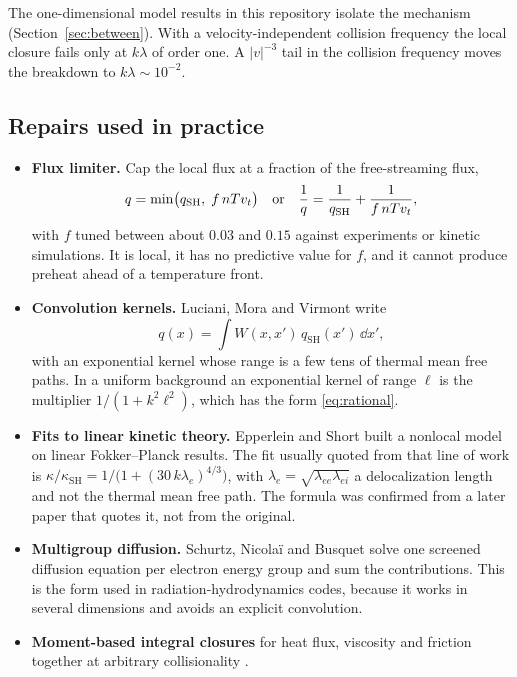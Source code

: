 The one-dimensional model results in this repository isolate the mechanism
(Section~\ref{sec:between}). With a velocity-independent collision
frequency the local closure fails only at $k\lambda$ of order one. A
$|v|^{-3}$ tail in the collision frequency moves the breakdown to
$k\lambda\sim10^{-2}$.

\subsection{Repairs used in practice}

\begin{itemize}
  \item \textbf{Flux limiter.} Cap the local flux at a fraction of the
    free-streaming flux,
    \begin{equation}
      q=\min\bigl(q_{\mathrm{SH}},\;f\,nTv_t\bigr)
      \quad\text{or}\quad
      \frac1q=\frac1{q_{\mathrm{SH}}}+\frac1{f\,nTv_t},
    \end{equation}
    with $f$ tuned between about $0.03$ and $0.15$ against experiments or
    kinetic simulations. It is local, it has no predictive value for $f$,
    and it cannot produce preheat ahead of a temperature front.
  \item \textbf{Convolution kernels.} Luciani, Mora and Virmont
    \cite{LMV83} write
    \begin{equation}
      q(x)=\int W(x,x')\,q_{\mathrm{SH}}(x')\,\dd x',
    \end{equation}
    with an exponential kernel whose range is a few tens of thermal mean
    free paths. In a uniform background an exponential kernel of range
    $\ell$ is the multiplier $1/(1+k^2\ell^2)$, which has the form
    \eqref{eq:rational}.
  \item \textbf{Fits to linear kinetic theory.} Epperlein and Short
    \cite{ES91} built a nonlocal model on linear Fokker--Planck results.
    The fit usually quoted from that line of work is
    $\kappa/\kappa_{\mathrm{SH}}=1/\bigl(1+(30\,k\lambda_e)^{4/3}\bigr)$,
    with $\lambda_e=\sqrt{\lambda_{ee}\lambda_{ei}}$ a delocalization length
    and not the thermal mean free path. The formula was confirmed from a
    later paper that quotes it, not from the original.
  \item \textbf{Multigroup diffusion.} Schurtz, Nicola\"i and Busquet
    \cite{SNB00} solve one screened diffusion equation per electron energy
    group and sum the contributions. This is the form used in
    radiation-hydrodynamics codes, because it works in several dimensions
    and avoids an explicit convolution.
  \item \textbf{Moment-based integral closures} for heat flux, viscosity
    and friction together at arbitrary collisionality \cite{JiHeld14}.
\end{itemize}
